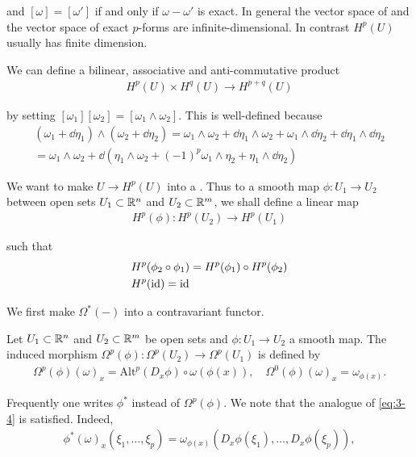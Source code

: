 and $[\omega] = [\omega']$ if and only if $\omega-\omega'$ is exact. In general the vector space of  
and the vector space of exact $p$-forms are infinite-dimensional. In contrast $H^p(U)$ usually has finite dimension.

We can define a bilinear, associative and anti-commutative product 
\begin{align}\label{eq:3-3}
  H^p(U)\times H^q(U)\to H^{p+q}(U)
\end{align}

by setting $[\omega_1][\omega_2] = [\omega_1\wedge\omega_2]$. This is well-defined because
\begin{align*}
  (\omega_1+\dd\eta_1)\wedge(\omega_2+\dd\eta_2)
  = \omega_1\wedge\omega_2 + \dd\eta_1\wedge\omega_2 + \omega_1\wedge\dd\eta_2 + \dd\eta_1\wedge\dd\eta_2 \\
  = \omega_1\wedge\omega_2 + \dd(\eta_1\wedge\omega_2 + (-1)^p\omega_1\wedge\eta_2 + \eta_1\wedge\dd\eta_2)
\end{align*}

We want to make $U\to H^p(U)$ into a . Thus to a smooth
map $\phi:U_1\to U_2$ between open sets $U_1\subset{\ensuremath{\mathbb{R}}}^n$ and $U_2\subset{\ensuremath{\mathbb{R}}}^m$, we shall define
a linear map
\begin{align*}
  H^p(\phi): H^p(U_2)\to H^p(U_1)
\end{align*}

such that 
\begin{align}\label{eq:3-4}
\begin{aligned}
  & H^p(\phi_2\circ\phi_1) = H^p(\phi_1)\circ H^p(\phi_2)\\
  & H^p(\operatorname{id})  = \operatorname{id}
\end{aligned}
\end{align}

We first make $\Omega^*(-)$ into a contravariant functor.

\begin{definition}\label{definition:3-10}
  Let $U_1\subset{\ensuremath{\mathbb{R}}}^n$ and $U_2\subset{\ensuremath{\mathbb{R}}}^m$ be open sets and $\phi:U_1\to U_2$ a 
  smooth map. The induced morphism $\Omega^p(\phi):\Omega^p(U_2)\to \Omega^p(U_1)$ is defined by 
  \begin{align*}
    \Omega^p(\phi)(\omega)_x=\mathrm{Alt}^p(D_x\phi)\circ\omega(\phi(x)),\quad\Omega^0(\phi)(\omega)_x=\omega_{\phi(x)}.    
  \end{align*}
\end{definition}

Frequently one writes $\phi^*$ instead of $\Omega^p(\phi)$. We note that the analogue of \eqref{eq:3-4} is 
satisfied. Indeed,
\begin{align*}
  \phi^*(\omega)_x(\xi_1,\ldots,\xi_p)=\omega_{\phi(x)}(D_x\phi(\xi_1),\ldots,D_x\phi(\xi_p)),
\end{align*}

